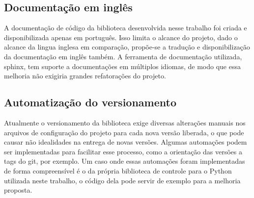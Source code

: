 \subsection{Documentação em inglês}
A documentação de código da biblioteca desenvolvida nesse trabalho foi criada e disponibilizada apenas em português.
Isso limita o alcance do projeto, dado o alcance da lingua inglesa em comparação, propõe-se a tradução e
disponibilização da documentação em inglês também.
A ferramenta de documentação utilizada, sphinx, tem suporte a documentações em múltiplos idiomas, de modo que essa
melhoria não exigiria grandes refatorações do projeto.

\subsection{Automatização do versionamento}
Atualmente o versionamento da biblioteca exige diversas alterações manuais nos arquivos de configuração do projeto para
cada nova versão liberada, o que pode causar não idealidades na entrega de novas versões.
Algumas automações podem ser implementadas para facilitar esse processo, como a orientação das versões a tags do git,
por exemplo.
Um caso onde essas automações foram implementadas de forma compreensível é o da própria biblioteca de controle para o
Python utilizada neste trabalho, o código dela pode servir de exemplo para a melhoria proposta.
